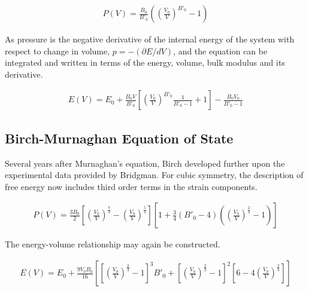 \begin{equation}
\begin{split}
P(V) = \frac{B_0}{{B'}_0}\left(\left(\frac{V_0}{V}\right)^{{B'}_0}-1\right)
\end{split}
\label{eq:eqMurnachanEquationofStatePressure}
\end{equation}

As pressure is the negative derivative of the internal energy of the system with respect to change in volume, $p = -(\partial E/dV)$, and the equation can be integrated and written in terms of the energy, volume, bulk modulus and its derivative\cite{crystaleos}.

\begin{equation}
\begin{split}
E(V) = E_0 + \frac{B_0 V}{{B'}_0} \left[\left(\frac{V_0}{V}\right)^{{B'}_0} \frac{1}{{B'}_0 - 1} + 1 \right] - \frac{B_0 V_0}{{B'}_0-1}
\end{split}
\label{eq:eqMurnachanEquationofStateEnergy}
\end{equation}

\subsection{Birch-Murnaghan Equation of State}

Several years after Murnaghan's equation, Birch developed further upon the experimental data provided by Bridgman.  For cubic symmetry, the description of free energy now includes third order terms in the strain components\cite{birchmurnaghaneq}.

\begin{equation}
\begin{split}
P(V) = \frac{3 B_0}{2} \left[\left(\frac{V_0}{V}\right)^{\frac{7}{3}}-\left(\frac{V_0}{V}\right)^{\frac{5}{3}}\right] \left[1 + \frac{3}{4}({B'}_0-4)\left(\left(\frac{V_0}{V}\right)^{\frac{2}{3}}-1\right)\right]
\end{split}
\label{eq:eqMurnachan Equation of State}
\end{equation}

The energy-volume relationship may again be constructed\cite{crystaleos}.

\begin{equation}
\begin{split}
E(V) = E_0 + \frac{9 V_0 B_0}{16} \left[ \left[ \left(\frac{V_0}{V} \right)^{\frac{2}{3}}-1\right]^{3} {B'}_0 + \left[ \left(\frac{V_0}{V} \right)^{\frac{2}{3}}-1\right]^{2} \left[6 - 4 \left(\frac{V_0}{V} \right)^{\frac{2}{3}}\right] \right]
\end{split}
\label{eq:eqMurnachanEquationofStateVolume}
\end{equation}



